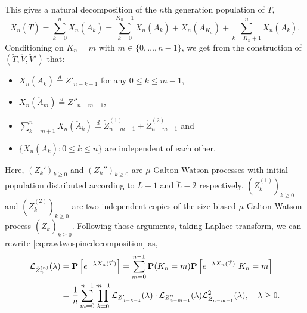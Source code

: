 \documentclass[12pt]{amsart}
\numberwithin{equation}{section}
\newcommand{\prob}{\mathbf P}
\newcommand{\brac}[1]{\left[ #1 \right]}
\newcommand{\set}[1]{\left\{ #1 \right\}}
\newcommand{\eqlaw}{\overset{d}{=}}
\begin{document}
	This gives a natural decomposition of the $n$th generation population of $\ddot T$,
\begin{equation}
\label{eq:rawtwospinedecomposition}
		X_n(\ddot T)
	=
		\sum_{k=0}^nX_n(\ddot A_k)
	=
	    \sum_{k=0}^{K_n-1}X_n(\ddot A_k)
	+
		X_n(\ddot A_{K_n})
	+
		\sum_{k=K_n+1}^nX_n(\ddot A_k).
\end{equation}
	Conditioning on $K_n=m$ with 
	$m\in\{0,\dots,n-1\}$, 
	we get from the construction of $(\ddot T,\ddot V,\ddot V')$ that:
\begin{itemize}
\item
    $X_n(\ddot A_k)\eqlaw Z'_{n-k-1}$ for any $0\le k\le m-1$,
\item
    $X_n(\ddot A_m)\eqlaw Z''_{n-m-1}$,
\item
    $\sum_{k=m+1}^nX_n(\ddot A_k)\eqlaw \dot Z_{n-m-1}^{(1)}+\dot Z_{n-m-1}^{(2)}$ and
\item
    $\{X_n(\ddot A_k):0\le k\le n\}$ 
    are independent of each other.
\end{itemize}
	Here, $(Z_k')_{k\ge 0}$ and $(Z_k'')_{k\ge 0}$ are $\mu$-Galton-Watson processes with initial population distributed according to $\dot L-1$ and $\ddot L-2$ respectively. $(\dot Z_k^{(1)})_{k\ge 0}$ and $(\dot Z_k^{(2)})_{k\ge 0}$ are two independent copies of the size-biased $\mu$-Galton-Watson process $(\dot Z_k)_{k\ge 0}$. 
	Following those arguments, taking Laplace transform, we can rewrite \eqref{eq:rawtwospinedecomposition} as,
\begin{equation}
\label{eq:laplacetransformationoftwospinedecomposition}
\begin{split}
		\cL_{\ddot Z_n^{(n)}}(\lambda)
	&=
		\prob\brac{e^{-\lambda X_n(\ddot T)}}
	=
	    \sum_{m=0}^{n-1}\prob(K_n=m)\prob\brac{e^{-\lambda X_n(\ddot T)}\big| K_n=m}
	\\&=
        \frac{1}{n}\sum_{m=0}^{n-1}\prod_{k=0}^{m-1}\cL_{Z'_{n-k-1}}(\lambda)
    \cdot
        \cL_{Z''_{n-m-1}}(\lambda)\cL_{\dot Z_{n-m-1}}^2(\lambda)
    ,\quad\lambda\geq 0.
\end{split}
\end{equation}
\medskip
\end{document}

